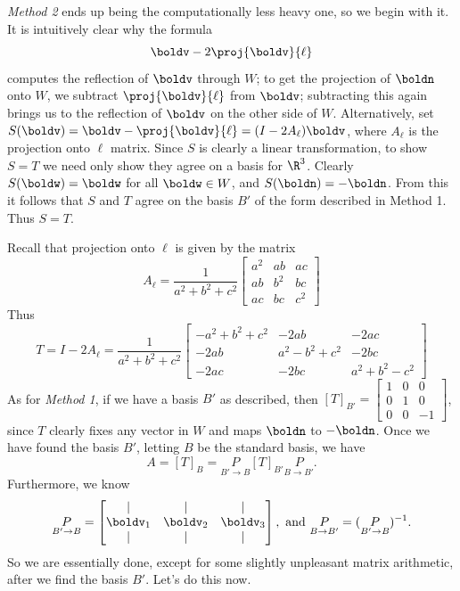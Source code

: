 \begin{solution}
\noindent
{\em Method 2} ends up being the computationally less heavy one, so we begin with it. It is intuitively clear why the formula 
\[
\boldv-2\proj{\boldv}{\ell}
\]
computes the reflection of $\boldv$ through $W$; to get the projection of $\boldn$ onto $W$, we subtract $\proj{\boldv}{\ell}$ from $\boldv$; subtracting this again brings us to the reflection of $\boldv$ on the other side of $W$. Alternatively, set $S(\boldv)=\boldv-\proj{\boldv}{\ell}=(I-2A_\ell)\boldv$, where $A_\ell$ is the projection onto $\ell$ matrix. Since $S$ is clearly a linear transformation, to show $S=T$ we need only show they agree on a basis for $\R^3$. Clearly $S(\boldw)=\boldw$ for all $\boldw\in W$, and $S(\boldn)=-\boldn$. From this it follows that $S$ and $T$ agree on the basis $B'$ of the form described in Method 1. Thus $S=T$. 

Recall that projection onto $\ell$ is given by the matrix 
\[
A_\ell=\frac{1}{a^2+b^2+c^2}\begin{bmatrix}
a^2&ab&ac\\
ab&b^2&bc\\
ac&bc&c^2
\end{bmatrix}
\]
Thus 
\[
T=I-2A_{\ell}=
\frac{1}{a^2+b^2+c^2}\begin{bmatrix}
-a^2+b^2+c^2&-2ab&-2ac\\
-2ab&a^2-b^2+c^2&-2bc\\
-2ac&-2bc&a^2+b^2-c^2
\end{bmatrix}
\]
As for {\em Method 1}, if we have a basis $B'$ as described, then $[T]_{B'}=\begin{bmatrix}
1&0&0\\
0&1&0\\
0&0&-1
\end{bmatrix}$, since $T$ clearly fixes any vector in $W$ and maps $\boldn$ to $-\boldn$. Once we have found the basis $B'$, letting $B$ be the standard basis, we have 
\[
A=[T]_B=\underset{B'\rightarrow B}{P}[T]_{B'}\underset{B\rightarrow B'}{P}.
\]
Furthermore, we know 
\[
\underset{B'\rightarrow B}{P}=\begin{bmatrix}
\vert&\vert&\vert\\
\boldv_1&\boldv_2&\boldv_3\\
\vert&\vert&\vert
\end{bmatrix}, \text{ and } \underset{B\rightarrow B'}{P}=(\underset{B'\rightarrow B}{P})^{-1}.
\]
So we are essentially done, except for some slightly unpleasant matrix arithmetic, after we find the basis $B'$. Let's do this now. 


\end{solution}
